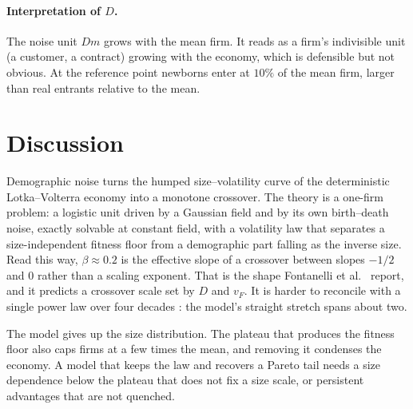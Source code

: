 \documentclass[pre,twocolumn,superscriptaddress,nofootinbib]{revtex4-2}
\begin{document}
\paragraph{Interpretation of $D$.}  The noise unit $Dm$ grows with the mean firm.  It reads as a
firm's indivisible unit (a customer, a contract) growing with the economy, which is defensible
but not obvious.  At the reference point newborns enter at $10\%$ of the mean firm, larger than
real entrants relative to the mean.

\section{Discussion}

Demographic noise turns the humped size--volatility curve of the deterministic Lotka--Volterra
economy into a monotone crossover.  The theory is a one-firm problem: a logistic unit driven by a
Gaussian field and by its own birth--death noise, exactly solvable at constant field, with a
volatility law that separates a size-independent fitness floor from a demographic part falling
as the inverse size.  Read this way, $\beta\approx0.2$ is the effective slope of a crossover between
slopes $-1/2$ and $0$ rather than a scaling exponent.  That is the shape Fontanelli et
al.\ \cite{fontanelli2025} report, and it predicts a crossover scale set by $D$ and $v_F$.  It is
harder to reconcile with a single power law over four decades \cite{moran2024}: the model's
straight stretch spans about two.

The model gives up the size distribution.  The plateau that produces the fitness floor also
caps firms at a few times the mean, and removing it condenses the economy.  A model that keeps
the law and recovers a Pareto tail needs a size dependence below the plateau that does not fix a
size scale, or persistent advantages that are not quenched.
\end{document}
